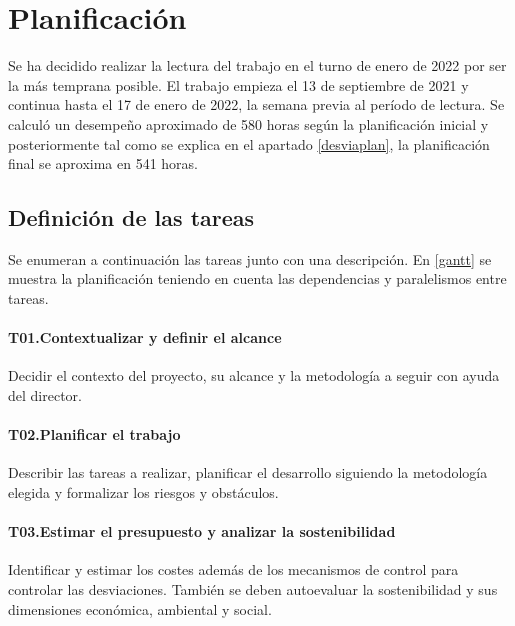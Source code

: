 
\chapter{Planificación}\label{desctasks}
Se ha decidido realizar la lectura del trabajo en el turno de enero de 2022 por ser la más
temprana posible. El trabajo empieza el 13 de septiembre
de 2021 y continua hasta el 17 de enero de 2022, la semana previa al período de lectura.
Se calculó un desempeño aproximado de 580 horas según la planificación inicial y posteriormente tal como se
explica en el apartado \ref{desviaplan}, la planificación final se aproxima en 541 horas.

\section{Definición de las tareas}
Se enumeran a continuación las tareas junto con una descripción. En \ref{gantt} se muestra la planificación teniendo
en cuenta las dependencias y paralelismos entre tareas.
\subsubsection{T01.\quad Contextualizar y definir el alcance}\label{T01}
Decidir el contexto del proyecto, su alcance y la metodología a seguir con ayuda
del director.
\subsubsection{T02.\quad Planificar el trabajo}\label{T02}
Describir las tareas a realizar, planificar el desarrollo siguiendo la
metodología elegida y formalizar los riesgos y obstáculos.
\subsubsection{T03.\quad Estimar el presupuesto y analizar la sostenibilidad}\label{T03}
Identificar y estimar los costes además de los mecanismos de control para controlar las
desviaciones. También se deben autoevaluar la sostenibilidad y sus dimensiones económica,
ambiental y social.
